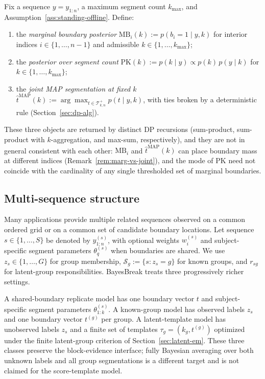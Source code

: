 \begin{definition}
\label{def:posterior-summaries}
Fix a sequence $y=y_{1:n}$, a maximum segment count $k_{\max}$, and Assumption~\ref{ass:standing-offline}.
Define:
\begin{enumerate}[label=(\alph*), leftmargin=2.3em]
    \item the \emph{marginal boundary posterior}
    \(\mathrm{MB}_i(k):=p(b_i=1\mid y,k)\)
    for interior indices $i\in\{1,\dots,n-1\}$ and admissible $k\in\{1,\dots,k_{\max}\}$;
    \item the \emph{posterior over segment count}
    \(\mathrm{PK}(k):=p(k\mid y)\propto p(k)\,p(y\mid k)\)
    for $k\in\{1,\dots,k_{\max}\}$;
    \item the \emph{joint MAP segmentation at fixed $k$}
    \(\widehat t^{\mathrm{MAP}}(k):=\arg\max_{t\in\mathcal{T}^{+}_{k,n}} p(t\mid y,k)\),
    with ties broken by a deterministic rule (Section~\ref{sec:dp-alg}).
\end{enumerate}
These three objects are returned by distinct DP recursions (sum-product, sum-product with
$k$-aggregation, and max-sum, respectively), and they are not in general consistent with each
other: $\mathrm{MB}_i$ and $\widehat t^{\mathrm{MAP}}(k)$ can place boundary mass at different
indices (Remark~\ref{rem:marg-vs-joint}), and the mode of $\mathrm{PK}$ need not coincide with
the cardinality of any single thresholded set of marginal boundaries.
\end{definition}

\subsection{Multi-sequence structure}
\label{sec:problem-multiseq}

Many applications provide multiple related sequences observed on a common ordered grid or on a
common set of candidate boundary locations. Let sequence $s\in\{1,\dots,S\}$ be denoted by
$y^{(s)}_{1:n}$, with optional weights $w_i^{(s)}$ and subject-specific segment parameters
$\theta_q^{(s)}$ when boundaries are shared. We use $z_s\in\{1,\dots,G\}$ for group membership,
$\mathcal{S}_g:=\{s:z_s=g\}$ for known groups, and $r_{sg}$ for latent-group responsibilities.
BayesBreak treats three progressively richer settings.

\begin{definition}
\label{def:multiseq-classes}
A shared-boundary replicate model has one boundary vector $t$ and subject-specific segment
parameters $\theta^{(s)}_{1:k}$. A known-group model has observed labels $z_s$ and one boundary
vector $t^{(g)}$ per group. A latent-template model has unobserved labels $z_s$ and a finite set of
templates $\tau_g=(k_g,t^{(g)})$ optimized under the finite latent-group criterion of
Section~\ref{sec:latent-em}. These three classes preserve the block-evidence interface; fully
Bayesian averaging over both unknown labels and all group segmentations is a different target and
is not claimed for the score-template model.
\end{definition}

